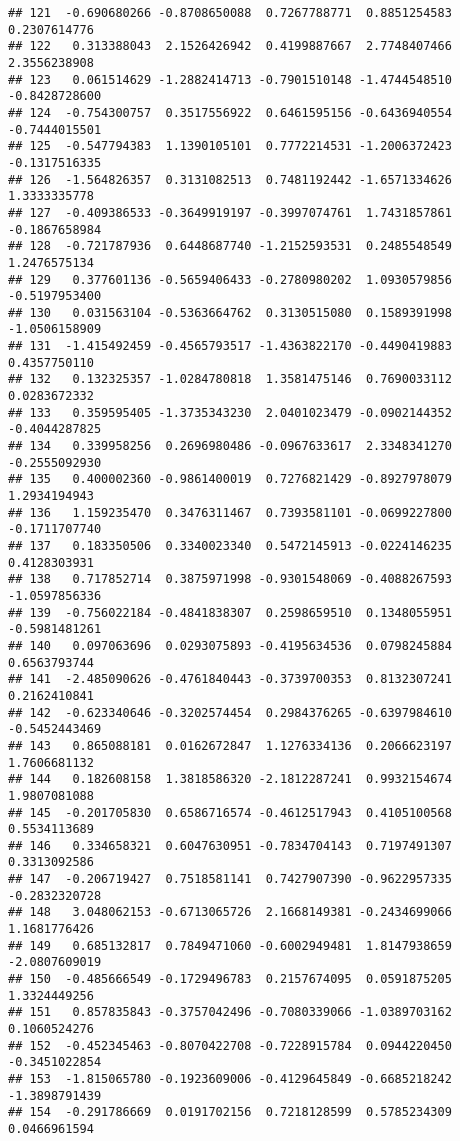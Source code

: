\documentclass[
]{article}
\begin{document}
\begin{verbatim}
## 121  -0.690680266 -0.8708650088  0.7267788771  0.8851254583  0.2307614776
## 122   0.313388043  2.1526426942  0.4199887667  2.7748407466  2.3556238908
## 123   0.061514629 -1.2882414713 -0.7901510148 -1.4744548510 -0.8428728600
## 124  -0.754300757  0.3517556922  0.6461595156 -0.6436940554 -0.7444015501
## 125  -0.547794383  1.1390105101  0.7772214531 -1.2006372423 -0.1317516335
## 126  -1.564826357  0.3131082513  0.7481192442 -1.6571334626  1.3333335778
## 127  -0.409386533 -0.3649919197 -0.3997074761  1.7431857861 -0.1867658984
## 128  -0.721787936  0.6448687740 -1.2152593531  0.2485548549  1.2476575134
## 129   0.377601136 -0.5659406433 -0.2780980202  1.0930579856 -0.5197953400
## 130   0.031563104 -0.5363664762  0.3130515080  0.1589391998 -1.0506158909
## 131  -1.415492459 -0.4565793517 -1.4363822170 -0.4490419883  0.4357750110
## 132   0.132325357 -1.0284780818  1.3581475146  0.7690033112  0.0283672332
## 133   0.359595405 -1.3735343230  2.0401023479 -0.0902144352 -0.4044287825
## 134   0.339958256  0.2696980486 -0.0967633617  2.3348341270 -0.2555092930
## 135   0.400002360 -0.9861400019  0.7276821429 -0.8927978079  1.2934194943
## 136   1.159235470  0.3476311467  0.7393581101 -0.0699227800 -0.1711707740
## 137   0.183350506  0.3340023340  0.5472145913 -0.0224146235  0.4128303931
## 138   0.717852714  0.3875971998 -0.9301548069 -0.4088267593 -1.0597856336
## 139  -0.756022184 -0.4841838307  0.2598659510  0.1348055951 -0.5981481261
## 140   0.097063696  0.0293075893 -0.4195634536  0.0798245884  0.6563793744
## 141  -2.485090626 -0.4761840443 -0.3739700353  0.8132307241  0.2162410841
## 142  -0.623340646 -0.3202574454  0.2984376265 -0.6397984610 -0.5452443469
## 143   0.865088181  0.0162672847  1.1276334136  0.2066623197  1.7606681132
## 144   0.182608158  1.3818586320 -2.1812287241  0.9932154674  1.9807081088
## 145  -0.201705830  0.6586716574 -0.4612517943  0.4105100568  0.5534113689
## 146   0.334658321  0.6047630951 -0.7834704143  0.7197491307  0.3313092586
## 147  -0.206719427  0.7518581141  0.7427907390 -0.9622957335 -0.2832320728
## 148   3.048062153 -0.6713065726  2.1668149381 -0.2434699066  1.1681776426
## 149   0.685132817  0.7849471060 -0.6002949481  1.8147938659 -2.0807609019
## 150  -0.485666549 -0.1729496783  0.2157674095  0.0591875205  1.3324449256
## 151   0.857835843 -0.3757042496 -0.7080339066 -1.0389703162  0.1060524276
## 152  -0.452345463 -0.8070422708 -0.7228915784  0.0944220450 -0.3451022854
## 153  -1.815065780 -0.1923609006 -0.4129645849 -0.6685218242 -1.3898791439
## 154  -0.291786669  0.0191702156  0.7218128599  0.5785234309  0.0466961594

\end{verbatim}
\end{document}
